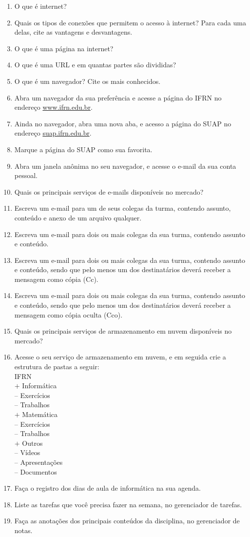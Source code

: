 \documentclass[11pt]{article}
\begin{document}
	\begin{enumerate}
		\item O que é internet?
		\item Quais os tipos de conexões que permitem o acesso à internet? Para cada uma delas, cite as vantagens e desvantagens.
		\item O que é uma página na internet?
		\item O que é uma URL e em quantas partes são divididas?
		\item O que é um navegador? Cite os mais conhecidos.
		\item Abra um navegador da sua preferência e acesse a página do IFRN no endere\c co \url{www.ifrn.edu.br}.
		\item Ainda no navegador, abra uma nova aba, e acesso a página do SUAP no endere\c co \url{suap.ifrn.edu.br}.
		\item Marque a página do SUAP como sua favorita.
		\item Abra um janela anônima no seu navegador, e acesse o e-mail da sua conta pessoal.
		\item Quais os principais servi\c cos de e-mails disponíveis no mercado?
		\item Escreva um e-mail para um de seus colegas da turma, contendo assunto, conteúdo e anexo de um arquivo qualquer.
		\item Escreva um e-mail para dois ou mais colegas da sua turma, contendo assunto e conteúdo.
		\item Escreva um e-mail para dois ou mais colegas da sua turma, contendo assunto e conteúdo, sendo que pelo menos um dos destinatários deverá receber a mensagem como cópia (Cc).
		\item Escreva um e-mail para dois ou mais colegas da sua turma, contendo assunto e conteúdo, sendo que pelo menos um dos destinatários deverá receber a mensagem como cópia oculta (Cco).
		\item Quais os principais servi\c cos de armazenamento em nuvem disponíveis no mercado?
		\item Acesse o seu servi\c co de armazenamento em nuvem, e em seguida crie a estrutura de pastas a seguir:\\
IFRN\\
$+$ Informática\\
-- Exercícios\\
-- Trabalhos\\
$+$ Matemática\\
-- Exercícios\\
-- Trabalhos\\
$+$ Outros\\
-- Vídeos\\
-- Apresentações\\
-- Documentos\\
		\item Fa\c ca o registro dos dias de aula de informática na sua agenda.
		\item Liste as tarefas que você precisa fazer na semana, no gerenciador de tarefas.
		\item Fa\c ca as anota\c cões dos principais conteúdos da disciplina, no gerenciador de notas.
	\end{enumerate}
	
\end{document}
